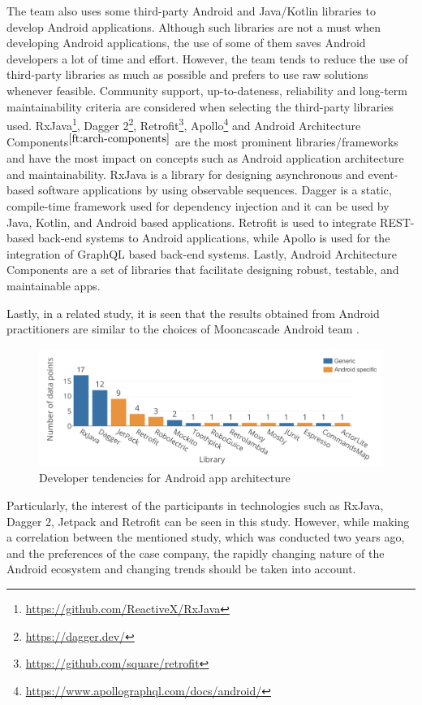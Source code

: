 The team also uses some third-party Android and Java/Kotlin libraries to develop Android applications. Although such libraries are not a must when developing Android applications, the use of some of them saves Android developers a lot of time and effort. However, the team tends to reduce the use of third-party libraries as much as possible and prefers to use raw solutions whenever feasible. Community support, up-to-dateness, reliability and long-term maintainability criteria are considered when selecting the third-party libraries used. RxJava\footnote{\url{https://github.com/ReactiveX/RxJava}}, Dagger 2\footnote{\url{https://dagger.dev/}}, Retrofit\footnote{\url{https://github.com/square/retrofit}}, Apollo\footnote{\url{https://www.apollographql.com/docs/android/}} and Android Architecture Components$^{\ref{ft:arch-components}}$ are the most prominent libraries/frameworks and have the most impact on concepts such as Android application architecture and maintainability. RxJava is a library for designing asynchronous and event-based software applications by using observable sequences. Dagger is a static, compile-time framework used for dependency injection and it can be used by Java, Kotlin, and Android based applications. Retrofit is used to integrate REST-based back-end systems to Android applications, while Apollo is used for the integration of GraphQL based back-end systems. Lastly, Android Architecture Components are a set of libraries that facilitate designing robust, testable, and maintainable apps.

Lastly, in a related study, it is seen that the results obtained from Android practitioners are similar to the choices of Mooncascade Android team \cite{14}.
\begin{figure}[ht!]
    \centering
    \includegraphics[scale=0.7]{figures/android-libraries.png}
    \caption{Developer tendencies for Android app architecture \protect\cite{14}}
    \label{fig:android-libraries}
\end{figure}
\FloatBarrier

Particularly, the interest of the participants in technologies such as RxJava, Dagger 2, Jetpack and Retrofit can be seen in this study. However, while making a correlation between the mentioned study, which was conducted two years ago, and the preferences of the case company, the rapidly changing nature of the Android ecosystem and changing trends should be taken into account.